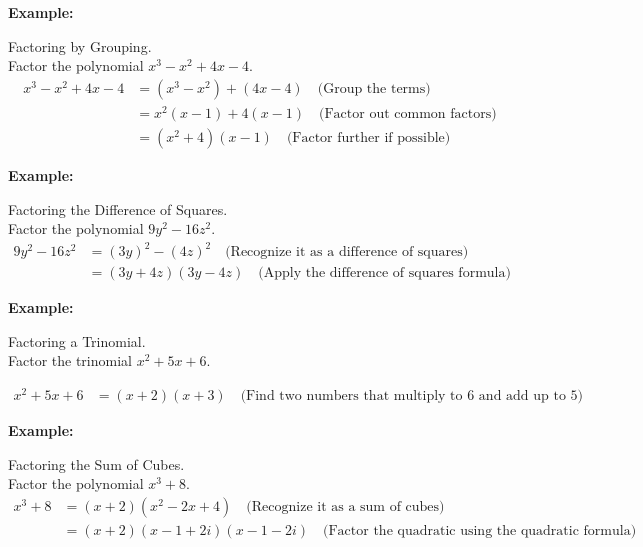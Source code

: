 \documentclass[12pt,a4paper]{article}
\newenvironment{example}
  {\begin{framed}\colorbox{examplecolor}{
  \parbox{\dimexpr\linewidth-2\fboxsep}{
  \textbf{Example:}}}}
  {\end{framed}}
\begin{document}
\begin{example}
Factoring by Grouping.\\
Factor the polynomial $x^3 - x^2 + 4x - 4$.
\begin{align*}
x^3 - x^2 + 4x - 4 &= (x^3 - x^2) + (4x - 4) \quad \text{(Group the terms)} \\
&= x^2(x - 1) + 4(x - 1) \quad \text{(Factor out common factors)} \\
&= (x^2 + 4)(x - 1) \quad \text{(Factor further if possible)}
\end{align*}
\end{example}
\begin{example}
Factoring the Difference of Squares.\\
Factor the polynomial $9y^2 - 16z^2$.
\begin{align*}
9y^2 - 16z^2 &= (3y)^2 - (4z)^2 \quad \text{(Recognize it as a difference of squares)} \\
&= (3y + 4z)(3y - 4z) \quad \text{(Apply the difference of squares formula)}
\end{align*}
\end{example}
\begin{example}
Factoring a Trinomial.\\
Factor the trinomial $x^2 + 5x + 6$.

\begin{align*}
x^2 + 5x + 6 &= (x + 2)(x + 3) \quad \text{(Find two numbers that multiply to 6 and add up to 5)}
\end{align*}
\end{example}
\begin{example}
Factoring the Sum of Cubes.\\
Factor the polynomial $x^3 + 8$.
\begin{align*}
x^3 + 8 &= (x + 2)(x^2 - 2x + 4) \quad \text{(Recognize it as a sum of cubes)} \\
&= (x + 2)(x - 1 + 2i)(x - 1 - 2i) \quad \text{(Factor the quadratic using the quadratic formula)}
\end{align*}
\end{example}
\end{document}
